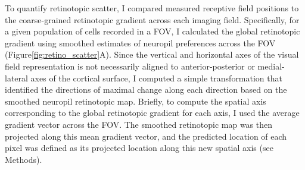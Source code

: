 To quantify retinotopic scatter, I compared measured receptive field positions to the coarse-grained retinotopic gradient across each imaging field. Specifically, for a given population of cells recorded in a FOV, I calculated the global retinotopic gradient using smoothed estimates of neuropil preferences across the FOV (Figure\ref{fig:retino_scatter}A). Since the vertical and horizontal axes of the visual field representation is not necessarily aligned to anterior-posterior or medial-lateral axes of the cortical surface, I computed a simple transformation that identified the directions of maximal change along each direction based on the smoothed neuropil retinotopic map. Briefly, to compute the spatial axis corresponding to the global retinotopic gradient for each axis, I used the average gradient vector across the FOV. The smoothed retinotopic map was then projected along this mean gradient vector, and the predicted location of each pixel was defined as its projected location along this new spatial axis (see Methods).  

